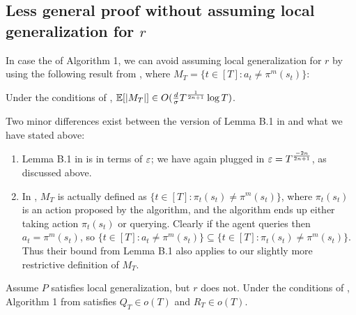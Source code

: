 \subsection{Less general proof without assuming local generalization for $r$}\label{sec:alt}

In case the of Algorithm 1, we can avoid assuming local generalization for $r$ by using the following result from \citet{plaut_avoiding_2024}, where $M_T = \{t \in [T]: a_t \ne \pi^m(s_t)\}$:

\begin{lemma}
Under the conditions of , $\operatorname*{\mathbb{E}}[|M_T|] \in O(\frac{d}{\sigma} T^\frac{1}{2n+1} \log T)$.
\end{lemma}

Two minor differences exist between the version of Lemma B.1 in \citet{plaut_avoiding_2024} and what we have stated above:
\begin{enumerate}
    \item Lemma B.1 in \citet{plaut_avoiding_2024} is in terms of $\varepsilon$; we have again plugged in $\varepsilon = T^\frac{-2n}{2n+1}$, as discussed above. 
    \item In \citet{plaut_avoiding_2024}, $M_T$ is actually defined as $\{t \in [T]: \pi_t(s_t) \ne \pi^m(s_t)\}$, where $\pi_t(s_t)$ is an action proposed by the algorithm, and the algorithm ends up either taking action $\pi_t(s_t)$ or querying. Clearly if the agent queries then $a_t = \pi^m(s_t)$, so $\{t \in [T]: a_t \ne \pi^m(s_t)\} \subseteq \{t \in [T]: \pi_t(s_t) \ne \pi^m(s_t)\}$. Thus their bound from Lemma B.1 also applies to our slightly more restrictive definition of $M_T$.
\end{enumerate}

\begin{theorem}
\label{thm:no-lg}
Assume $P$ satisfies local generalization, but $r$ does not. Under the conditions of , Algorithm 1 from \citet{plaut_avoiding_2024} satisfies $Q_T \in o(T)$ and $R_T \in o(T)$.
\end{theorem}

